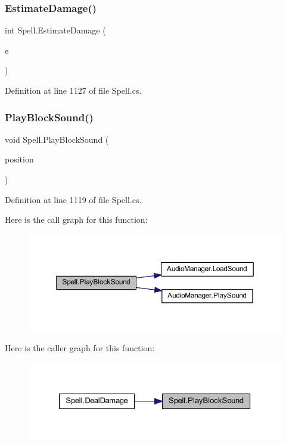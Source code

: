 \subsubsection{\texorpdfstring{EstimateDamage()}{EstimateDamage()}}
{\footnotesize\ttfamily int Spell.\+Estimate\+Damage (\begin{DoxyParamCaption}\item[{\mbox{\hyperlink{class_effect}{Effect}}}]{e }\end{DoxyParamCaption})}



Definition at line 1127 of file Spell.\+cs.

\mbox{\label{class_spell_a14ec832bc720a2763ff8a09f81d7c5d4}} 
\subsubsection{\texorpdfstring{PlayBlockSound()}{PlayBlockSound()}}
{\footnotesize\ttfamily void Spell.\+Play\+Block\+Sound (\begin{DoxyParamCaption}\item[{Vector2\+Int}]{position }\end{DoxyParamCaption})}



Definition at line 1119 of file Spell.\+cs.

Here is the call graph for this function\+:
\nopagebreak
\begin{figure}[H]
\begin{center}
\leavevmode
\includegraphics[width=350pt]{class_spell_a14ec832bc720a2763ff8a09f81d7c5d4_cgraph}
\end{center}
\end{figure}
Here is the caller graph for this function\+:
\nopagebreak
\begin{figure}[H]
\begin{center}
\leavevmode
\includegraphics[width=326pt]{class_spell_a14ec832bc720a2763ff8a09f81d7c5d4_icgraph}
\end{center}
\end{figure}
\mbox{\label{class_spell_a80aa52e9ed4b3555bd04682d93bc5049}} 
